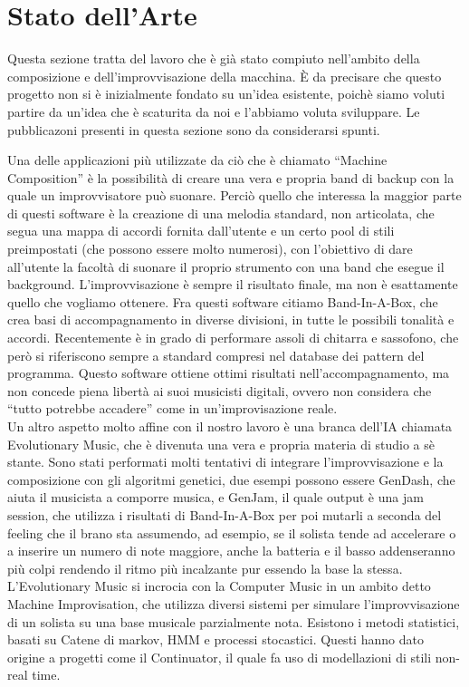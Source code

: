 \section{Stato dell'Arte}
Questa sezione tratta del lavoro che è già stato compiuto nell'ambito della composizione e dell'improvvisazione della macchina.
È da precisare che questo progetto non si è inizialmente fondato su un'idea esistente, poichè siamo voluti partire da un'idea che è scaturita da noi e l'abbiamo voluta sviluppare.
Le pubblicazoni presenti in questa sezione sono da considerarsi spunti.
\newline

Una delle applicazioni più utilizzate da ciò che è chiamato ``Machine Composition'' è la possibilità di creare una vera e propria band di backup con la quale un improvvisatore può suonare.
Perciò quello che interessa la maggior parte di questi software è la creazione di una melodia standard, non articolata, che segua una mappa di accordi fornita dall'utente e un certo pool di stili preimpostati (che possono essere molto numerosi), con l'obiettivo di dare all'utente la facoltà di suonare il proprio strumento con una band che esegue il background.
L'improvvisazione è sempre il risultato finale, ma non è esattamente quello che vogliamo ottenere.
Fra questi software citiamo Band-In-A-Box\cite{biab}, che crea basi di accompagnamento in diverse divisioni, in tutte le possibili tonalità e accordi.
Recentemente è in grado di performare assoli di chitarra e sassofono, che però si riferiscono sempre a standard compresi nel database dei pattern del programma.
Questo software ottiene ottimi risultati nell'accompagnamento, ma non concede piena libertà ai suoi musicisti digitali, ovvero non considera che ``tutto potrebbe accadere'' come in un'improvisazione reale.
\\
Un altro aspetto molto affine con il nostro lavoro è una branca dell'IA chiamata Evolutionary Music, che è divenuta una vera e propria materia di studio a sè stante\cite{evomus}.
Sono stati performati molti tentativi di integrare l'improvvisazione e la composizione con gli algoritmi genetici, due esempi possono essere GenDash\cite{gendash}, che aiuta il musicista a comporre  musica, e GenJam\cite{genjam}, il quale output è una jam session, che utilizza i risultati di Band-In-A-Box per poi mutarli a seconda del feeling che il brano sta assumendo, ad esempio, se il solista tende ad accelerare o a inserire un numero di note maggiore, anche la batteria e il basso addenseranno più colpi rendendo il ritmo più incalzante pur essendo la base la stessa.
\\
L'Evolutionary Music si incrocia con la Computer Music in un ambito detto Machine Improvisation, che utilizza diversi sistemi per simulare l'improvvisazione di un solista su una base musicale parzialmente nota.
Esistono i metodi statistici, basati su Catene di markov, HMM e processi stocastici\cite{hmm}.
Questi hanno dato origine a progetti come il Continuator\cite{cont}, il quale fa uso di modellazioni di stili non-real time\cite{dubnov}.
\newline

